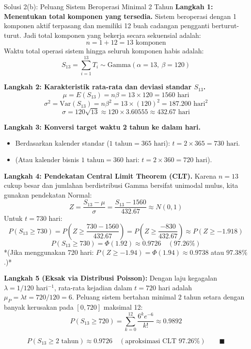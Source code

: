 \documentclass[10pt,twoside]{article}
\begin{document}
\begin{solbox}{Solusi 2(b): Peluang Sistem Beroperasi Minimal 2 Tahun}
\textbf{Langkah 1: Menentukan total komponen yang tersedia.}
Sistem beroperasi dengan 1 komponen aktif terpasang dan memiliki 12 buah cadangan pengganti berturut-turut. Jadi total komponen yang bekerja secara sekuensial adalah:
\[
n = 1 + 12 = 13 \text{ komponen}
\]
Waktu total operasi sistem hingga seluruh komponen habis adalah:
\[
S_{13} = \sum_{i=1}^{13} T_i \sim \text{Gamma}(\alpha = 13, \ \beta = 120)
\]

\textbf{Langkah 2: Karakteristik rata-rata dan deviasi standar $S_{13}$.}
\[
\mu = E(S_{13}) = n\beta = 13 \times 120 = 1560 \text{ hari}
\]
\[
\sigma^2 = \mathrm{Var}(S_{13}) = n\beta^2 = 13 \times (120)^2 = 187.200 \text{ hari}^2
\]
\[
\sigma = 120\sqrt{13} \approx 120 \times 3.60555 \approx 432.67 \text{ hari}
\]

\textbf{Langkah 3: Konversi target waktu 2 tahun ke dalam hari.}
\begin{itemize}
  \item Berdasarkan kalender standar ($1 \text{ tahun} = 365 \text{ hari}$): $t = 2 \times 365 = 730 \text{ hari}$.
  \item (Atau kalender bisnis $1 \text{ tahun} = 360 \text{ hari}$: $t = 2 \times 360 = 720 \text{ hari}$).
\end{itemize}

\textbf{Langkah 4: Pendekatan Central Limit Theorem (CLT).}
Karena $n = 13$ cukup besar dan jumlahan berdistribusi Gamma bersifat unimodal mulus, kita gunakan pendekatan Normal:
\[
Z = \frac{S_{13} - \mu}{\sigma} = \frac{S_{13} - 1560}{432.67} \approx N(0, 1)
\]
Untuk $t = 730$ hari:
\[
P(S_{13} \ge 730) = P\left(Z \ge \frac{730 - 1560}{432.67}\right) = P\left(Z \ge \frac{-830}{432.67}\right) \approx P(Z \ge -1.918)
\]
\[
P(S_{13} \ge 730) = \Phi(1.92) \approx 0.9726 \quad (97.26\%)
\]
*(Jika menggunakan 720 hari: $P(Z \ge -1.94) = \Phi(1.94) \approx 0.9738$ atau $97.38\%$.)*

\textbf{Langkah 5 (Eksak via Distribusi Poisson):}
Dengan laju kegagalan $\lambda = 1/120$ hari$^{-1}$, rata-rata kejadian dalam $t = 720$ hari adalah $\mu_P = \lambda t = 720/120 = 6$. Peluang sistem bertahan minimal 2 tahun setara dengan banyak kerusakan pada $[0, 720]$ maksimal 12:
\[
P(S_{13} \ge 720) = \sum_{k=0}^{12} \frac{6^k e^{-6}}{k!} \approx 0.9892
\]

\[
\boxed{P(S_{13} \ge 2 \text{ tahun}) \approx 0.9726 \quad (\text{aproksimasi CLT } 97.26\%)} \qquad \blacksquare
\]
\end{solbox}
\end{document}

